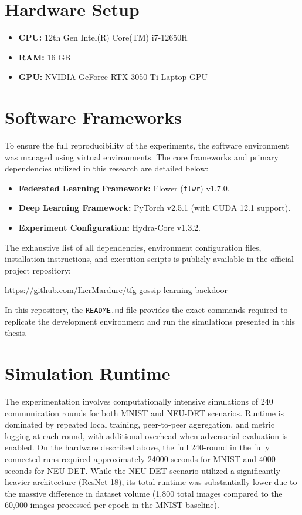 \section{Hardware Setup}
\begin{itemize}
	\item \textbf{CPU:} 12th Gen Intel(R) Core(TM) i7-12650H
	\item \textbf{RAM:} 16 GB
	\item \textbf{GPU:} NVIDIA GeForce RTX 3050 Ti Laptop GPU
\end{itemize}

\section{Software Frameworks}
To ensure the full reproducibility of the experiments, the software environment was managed using virtual environments. The core frameworks and primary dependencies utilized in this research are detailed below:

\begin{itemize}
    \item \textbf{Federated Learning Framework:} Flower (\texttt{flwr}) v1.7.0.
    \item \textbf{Deep Learning Framework:} PyTorch v2.5.1 (with CUDA 12.1 support).
    \item \textbf{Experiment Configuration:} Hydra-Core v1.3.2.
\end{itemize}

The exhaustive list of all dependencies, environment configuration files, installation instructions, and execution scripts is publicly available in the official project repository:
\begin{center}
    \url{https://github.com/IkerMardure/tfg-gossip-learning-backdoor}
\end{center}
In this repository, the \texttt{README.md} file provides the exact commands required to replicate the development environment and run the simulations presented in this thesis.

\section{Simulation Runtime}
The experimentation involves computationally intensive simulations of 240 communication
rounds for both MNIST and NEU-DET scenarios. Runtime is dominated by
repeated local training, peer-to-peer aggregation, and metric logging at each round, with
additional overhead when adversarial evaluation is enabled. On the hardware described
above, the full 240-round in the fully connected runs required approximately 24000 seconds
for MNIST and 4000 seconds for NEU-DET. While the NEU-DET scenario utilized
a significantly heavier architecture (ResNet-18), its total runtime was substantially lower
due to the massive difference in dataset volume (1,800 total images compared to the 60,000
images processed per epoch in the MNIST baseline).